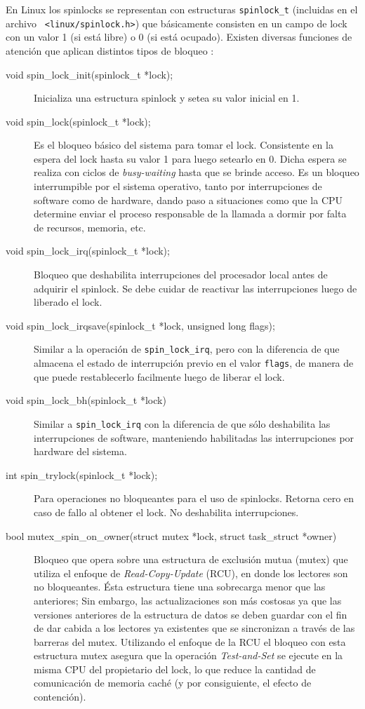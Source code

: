 En Linux los spinlocks se representan con estructuras \verb=spinlock_t= (incluidas en el archivo \verb= <linux/spinlock.h>=) que básicamente consisten en un campo de lock con un valor 1 (si está libre) o 0 (si está ocupado). Existen diversas funciones de atención que aplican distintos tipos de bloqueo \cite{book:spinlocks}:

\begin{description}
\item[void spin\_lock\_init(spinlock\_t *lock);] Inicializa una estructura spinlock y setea su valor inicial en 1.
\item[void spin\_lock(spinlock\_t *lock);] Es el bloqueo básico del sistema para tomar el lock. Consistente en la espera del lock hasta su valor 1 para luego setearlo en 0. Dicha espera se realiza con ciclos de \emph{busy-waiting} hasta que se brinde acceso. Es un bloqueo interrumpible por el sistema operativo, tanto por interrupciones de software como de hardware, dando paso a situaciones como que la CPU determine enviar el proceso responsable de la llamada a dormir por falta de recursos, memoria, etc.
\item[void spin\_lock\_irq(spinlock\_t *lock);] Bloqueo que deshabilita interrupciones del procesador local antes de adquirir el spinlock. Se debe cuidar de reactivar las interrupciones luego de liberado el lock.
\item[void spin\_lock\_irqsave(spinlock\_t *lock, unsigned long flags);] Similar a la operación de \verb=spin_lock_irq=, pero con la diferencia de que almacena el estado de interrupción previo en el valor \verb=flags=, de manera de que puede restablecerlo facilmente luego de liberar el lock.
\item[void spin\_lock\_bh(spinlock\_t *lock)] Similar a \verb=spin_lock_irq= con la diferencia de que sólo deshabilita las interrupciones de software, manteniendo habilitadas las interrupciones por hardware del sistema.
\item[int spin\_trylock(spinlock\_t *lock);] Para operaciones no bloqueantes para el uso de spinlocks. Retorna cero en caso de fallo al obtener el lock. No deshabilita interrupciones.
\item[bool mutex\_spin\_on\_owner(struct mutex *lock, struct task\_struct *owner)] Bloqueo que opera sobre una estructura de exclusión mutua (mutex) que utiliza el enfoque de \emph{Read-Copy-Update} (RCU), en donde los lectores son no bloqueantes. Ésta estructura tiene una sobrecarga menor que las anteriores; Sin embargo, las actualizaciones son más costosas ya que las versiones anteriores de la estructura de datos se deben guardar con el fin de dar cabida a los lectores ya existentes que se sincronizan a través de las barreras del mutex. Utilizando el enfoque de la RCU el bloqueo con esta estructura mutex asegura que la operación \emph{Test-and-Set} se ejecute en la misma CPU del propietario del lock, lo que reduce la cantidad de comunicación de memoria caché (y por consiguiente, el efecto de contención).
\end{description}

